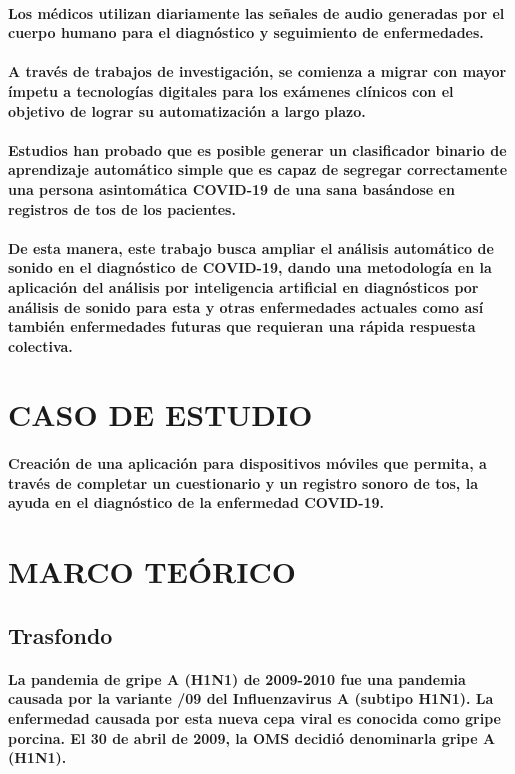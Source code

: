 \documentclass[a4paper,11pt,twocolumn]{article}
\newcommand{\sectionformat}{\centering}
\begin{document}
\paragraph{Los médicos utilizan diariamente las señales de audio generadas por el cuerpo humano para el diagnóstico y seguimiento de enfermedades.}
\paragraph{A través de trabajos de investigación, se comienza a migrar con mayor ímpetu a tecnologías digitales para los exámenes clínicos con el objetivo de lograr su automatización a largo plazo.}
\paragraph{Estudios han probado que es posible generar un clasificador binario de aprendizaje automático simple que es capaz de segregar correctamente una persona asintomática COVID-19 de una sana basándose en registros de tos de los pacientes.}
\paragraph{De esta manera, este trabajo busca ampliar el análisis automático de sonido en el diagnóstico de COVID-19, dando una metodología en la aplicación del análisis por inteligencia artificial en diagnósticos por análisis de sonido para esta y otras enfermedades actuales como así también enfermedades futuras que requieran una rápida respuesta colectiva.}
\section{\sectionformat CASO DE ESTUDIO}
\paragraph{Creación de una aplicación para dispositivos móviles que permita, a través de completar un cuestionario y un registro sonoro de tos, la ayuda en el diagnóstico de la enfermedad COVID-19.}
\section{\sectionformat MARCO TEÓRICO}
\subsection{Trasfondo}
\paragraph{La pandemia de gripe A (H1N1) de 2009-2010 fue una pandemia causada por la variante /09 del Influenzavirus A (subtipo H1N1). La enfermedad causada por esta nueva cepa viral es conocida como gripe porcina. El 30 de abril de 2009, la OMS decidió denominarla gripe A (H1N1).}
\end{document}
